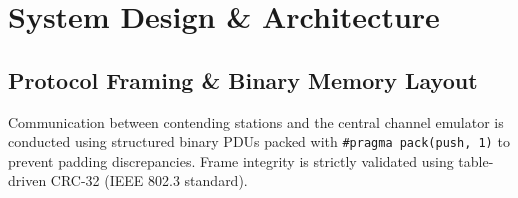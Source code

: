 \documentclass[11pt,a4paper]{article}
\begin{document}
\clearpage
{}

\section{System Design \& Architecture}

\subsection{Protocol Framing \& Binary Memory Layout}
Communication between contending stations and the central channel emulator is conducted using structured binary PDUs packed with \texttt{\#pragma pack(push, 1)} to prevent padding discrepancies. Frame integrity is strictly validated using table-driven CRC-32 (IEEE 802.3 standard).
\end{document}
